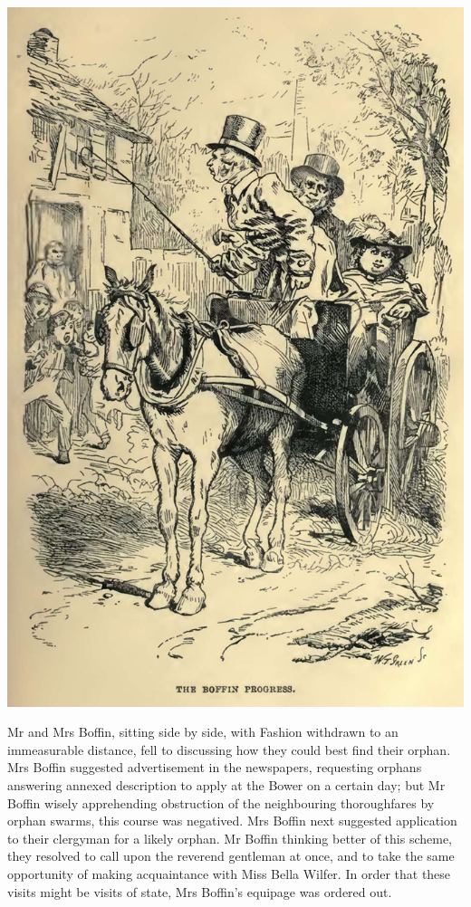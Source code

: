 \includegraphics[scale=2.3]{01-09-01}

Mr and Mrs Boffin, sitting side by side, with Fashion withdrawn to an
immeasurable distance, fell to discussing how they could best find their
orphan. Mrs Boffin suggested advertisement in the newspapers, requesting
orphans answering annexed description to apply at the Bower on a certain
day; but Mr Boffin wisely apprehending obstruction of the neighbouring
thoroughfares by orphan swarms, this course was negatived. Mrs Boffin
next suggested application to their clergyman for a likely orphan. Mr
Boffin thinking better of this scheme, they resolved to call upon the
reverend gentleman at once, and to take the same opportunity of making
acquaintance with Miss Bella Wilfer. In order that these visits might be
visits of state, Mrs Boffin’s equipage was ordered out.

